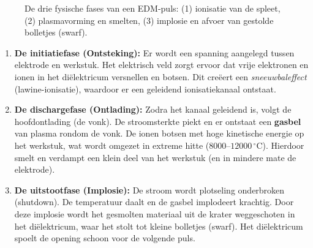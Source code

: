 \documentclass[a4paper,11pt,twoside]{report}
\begin{document}
\begin{figure}[htbp]
    \caption{De drie fysische fases van een EDM-puls: (1) ionisatie van de spleet, (2) plasmavorming en smelten, (3) implosie en afvoer van gestolde bolletjes (swarf).}
    \label{fig:edm_phases}
\end{figure}

\begin{enumerate}
    \item \textbf{De initiatiefase (Ontsteking):}
          Er wordt een spanning aangelegd tussen elektrode en werkstuk. Het elektrisch veld zorgt ervoor dat
          vrije elektronen en ionen in het diëlektricum versnellen en botsen.
          Dit creëert een \emph{sneeuwbaleffect} (lawine-ionisatie), waardoor er een geleidend ionisatiekanaal ontstaat.

    \item \textbf{De dischargefase (Ontlading):}
          Zodra het kanaal geleidend is, volgt de hoofdontlading (de vonk).
          De stroomsterkte piekt en er ontstaat een \textbf{gasbel} van plasma rondom de vonk.
          De ionen botsen met hoge kinetische energie op het werkstuk, wat wordt omgezet in extreme hitte ($8000\text{--}12000\,^\circ\text{C}$).
          Hierdoor smelt en verdampt een klein deel van het werkstuk (en in mindere mate de elektrode).

    \item \textbf{De uitstootfase (Implosie):}
          De stroom wordt plotseling onderbroken (shutdown).
          De temperatuur daalt en de gasbel implodeert krachtig.
          Door deze implosie wordt het gesmolten materiaal uit de krater weggeschoten in het diëlektricum,
          waar het stolt tot kleine bolletjes (swarf). Het diëlektricum spoelt de opening schoon voor de volgende puls.
\end{enumerate}
\end{document}
